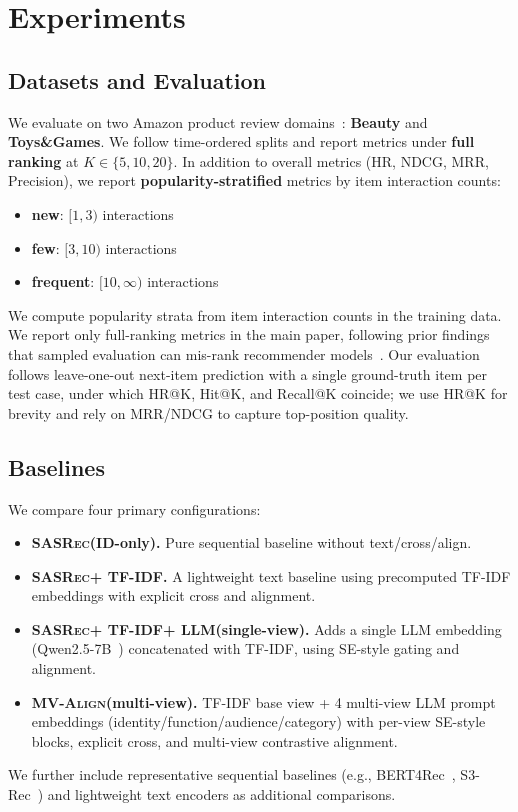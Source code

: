 \documentclass[sigconf,natbib=true,anonymous]{acmart}
\newcommand{\model}{\textsc{MV-Align}\xspace}
\newcommand{\base}{\textsc{SASRec}\xspace}
\newcommand{\tfidf}{\textsc{TF-IDF}\xspace}
\newcommand{\llm}{\textsc{LLM}\xspace}
\begin{document}
\section{Experiments}\label{sec:experiments}
\subsection{Datasets and Evaluation}
We evaluate on two Amazon product review domains~\cite{mcauley2015amazon,ni2019amazon}: \textbf{Beauty} and
\textbf{Toys\&Games}. We follow time-ordered splits and
report metrics under \textbf{full ranking} at $K\in\{5,10,20\}$.
In addition to overall metrics (HR, NDCG, MRR, Precision),
we report \textbf{popularity-stratified} metrics by item
interaction counts:
\begin{itemize}[leftmargin=*,itemsep=1pt]
  \item \textbf{new}: $[1,3)$ interactions
  \item \textbf{few}: $[3,10)$ interactions
  \item \textbf{frequent}: $[10,\infty)$ interactions
\end{itemize}
We compute popularity strata from item interaction counts in
the training data. We report only full-ranking metrics in the
main paper, following prior findings that sampled evaluation
can mis-rank recommender models~\cite{krichene2020sampledmetrics}. Our evaluation
follows leave-one-out next-item prediction with a single
ground-truth item per test case, under which HR@K, Hit@K, and
Recall@K coincide; we use HR@K for brevity and rely on
MRR/NDCG to capture top-position quality.

\subsection{Baselines}
We compare four primary configurations:
\begin{itemize}[leftmargin=*,itemsep=2pt]
  \item \textbf{\base (ID-only).} Pure sequential baseline
    without text/cross/align.
  \item \textbf{\base + \tfidf.} A lightweight text baseline
    using precomputed \tfidf embeddings with explicit cross
    and alignment.
  \item \textbf{\base + \tfidf + \llm (single-view).} Adds a
    single \llm embedding (Qwen2.5-7B~\cite{qwen2024qwen25}) concatenated with
    \tfidf, using SE-style gating and alignment.
  \item \textbf{\model (multi-view).} \tfidf base view + 4
    multi-view \llm prompt embeddings
    (identity/function/audience/category) with per-view SE-style blocks,
    explicit cross, and multi-view contrastive alignment.
\end{itemize}
We further include representative sequential baselines (e.g.,
BERT4Rec~\cite{sun2019bert4rec}, S3-Rec~\cite{zhou2020s3rec})
and lightweight text encoders as additional comparisons.
\end{document}
